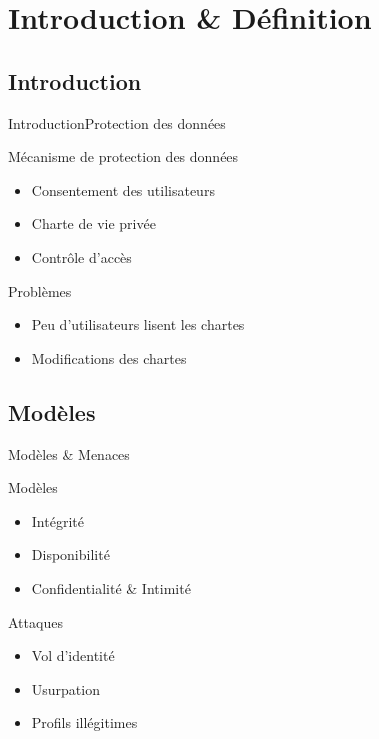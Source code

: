 

\maketitle

\section{Introduction \& Définition}

\subsection{Introduction}
\begin{frame}{Introduction}{Protection des données}

\begin{block}{Mécanisme de protection des données}
\begin{itemize}
\item Consentement des utilisateurs
\item Charte de vie privée
\item Contrôle d'accès
\end{itemize}
\end{block}

\begin{block}{Problèmes}
\begin{itemize}
\item Peu d'utilisateurs lisent les chartes
\item Modifications des chartes
\end{itemize}
\end{block}

\end{frame}

\subsection{Modèles}

\begin{frame}{Modèles \& Menaces}

\begin{block}{Modèles}
\begin{itemize}
\item Intégrité
\item Disponibilité
\item Confidentialité \& Intimité
\end{itemize}
\end{block}

\begin{block}{Attaques}
\begin{itemize}
\item Vol d'identité
\item Usurpation
\item Profils illégitimes
\end{itemize}
\end{block}
\end{frame}


